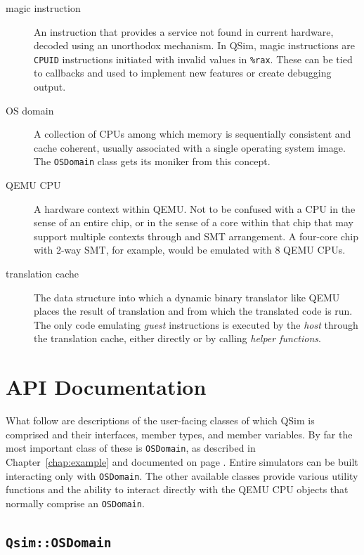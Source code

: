 \documentclass[letterpaper, 10pt]{book}
\begin{document}
\begin{description}
\item[magic instruction]
An instruction that provides a service not found in current hardware,
decoded using an unorthodox mechanism. In QSim, magic instructions are
\texttt{CPUID} instructions initiated with invalid values in \texttt{\%rax}.
These can be tied to callbacks and used to implement new features or create
debugging output.

\item[OS domain]
A collection of CPUs among which memory is sequentially consistent and cache
coherent, usually associated with a single operating system image. The 
\texttt{OSDomain} class gets its moniker from this concept.

\item[QEMU CPU]
A hardware context within QEMU. Not to be confused with a CPU in the sense
of an entire chip, or in the sense of a core within that chip that may 
support multiple contexts through and SMT arrangement. A four-core chip with
2-way SMT, for example, would be emulated with 8 QEMU CPUs.

\item[translation cache] 
The data structure into which a dynamic binary translator like QEMU places the
result of translation and from which the translated code is run. The only
code emulating \emph{guest} instructions is executed by the \emph{host}
through the translation cache, either directly or by calling 
\emph{helper functions}.
\end{description}

\appendix
\chapter{API Documentation}

What follow are descriptions of the user-facing classes of which QSim is 
comprised and their interfaces, member types, and member variables. By far
the most important class of these is \texttt{OSDomain}, as described in
Chapter~\ref{chap:example} and documented on page \pageref{class:OSDomain}.
Entire simulators can be built interacting only with \texttt{OSDomain}. The
other available classes provide various utility functions and the ability to
interact directly with the QEMU CPU objects that normally comprise an
\texttt{OSDomain}.

\newpage

\section{\texttt{Qsim::OSDomain}} \label{class:OSDomain}
\end{document}
